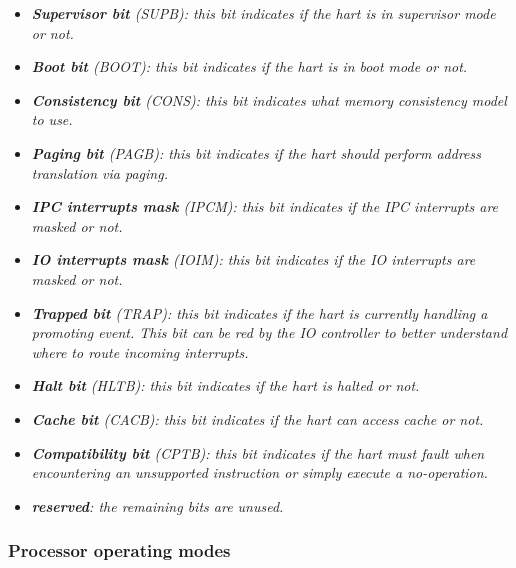 \documentclass{article}
\begin{document}
\begin{itemize}
                    \item \textit{\textbf{Supervisor bit} (SUPB): this bit indicates if the hart is in supervisor mode or not.}

                    \item \textit{\textbf{Boot bit} (BOOT): this bit indicates if the hart is in boot mode or not.}

                    \item \textit{\textbf{Consistency bit} (CONS): this bit indicates what memory consistency model to use.}

                    \item \textit{\textbf{Paging bit} (PAGB): this bit indicates if the hart should perform address translation via paging.}

                    \item \textit{\textbf{IPC interrupts mask} (IPCM): this bit indicates if the IPC interrupts are masked or not.}

                    \item \textit{\textbf{IO interrupts mask} (IOIM): this bit indicates if the IO interrupts are masked or not.}

                    \item \textit{\textbf{Trapped bit} (TRAP): this bit indicates if the hart is currently handling a promoting event. This bit can be red by the IO controller to better understand where to route incoming interrupts.}

                    \item \textit{\textbf{Halt bit} (HLTB): this bit indicates if the hart is halted or not.}

                    \item \textit{\textbf{Cache bit} (CACB): this bit indicates if the hart can access cache or not.}

                    \item \textit{\textbf{Compatibility bit} (CPTB): this bit indicates if the hart must fault when encountering an unsupported instruction or simply execute a no-operation.}

                    \item \textit{\textbf{reserved}: the remaining bits are unused.}

                \end{itemize}

            \subsubsection{Processor operating modes}
\end{document}
